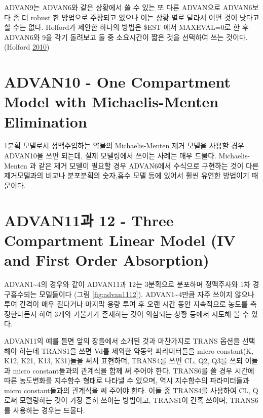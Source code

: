 \documentclass[
  11pt,
  krantz2, a4paper, twoside]{krantz}
\theoremstyle{definition}
\theoremstyle{definition}
\theoremstyle{definition}
\theoremstyle{remark}
\begin{document}

ADVAN9는 ADVAN6와 같은 상황에서 쓸 수 있는 또 다른 ADVAN으로 ADVAN6보다 좀 더 robust 한 방법으로 주장되고 있으나 이는 상황 별로 달라서 어떤 것이 낫다고 할 수는 없다. Holford가 제안한 하나의 방법은 \$EST 에서 MAXEVAL=0로 한 후 ADVAN6와 9을 각기 돌려보고 둘 중 소요시간이 짧은 것을 선택하여 쓰는 것이다. (Holford \protect\hyperlink{ref-nickholford}{2010})

\hypertarget{advan10---one-compartment-model-with-michaelis-menten-elimination}{%
\section{ADVAN10 - One Compartment Model with Michaelis-Menten Elimination}\label{advan10---one-compartment-model-with-michaelis-menten-elimination}}


1분획 모델로서 정맥주입하는 약물의 Michaelis-Menten 제거 모델을 사용할 경우 ADVAN10을 쓰면 되는데, 실제 모델링에서 쓰이는 사례는 매우 드물다. Michaelis-Menten 과 같은 제거 모델이 필요할 경우 ADVAN6에서 수식으로 구현하는 것이 다른 제거모델과의 비교나 분포분획의 숫자,흡수 모델 등에 있어서 훨씬 유연한 방법이기 때문이다.

\hypertarget{advan11uxacfc-12---three-compartment-linear-model-iv-and-first-order-absorption}{%
\section{ADVAN11과 12 - Three Compartment Linear Model (IV and First Order Absorption)}\label{advan11uxacfc-12---three-compartment-linear-model-iv-and-first-order-absorption}}


ADVAN1\textasciitilde4의 경우와 같이 ADVAN11과 12는 3분획으로 분포하며 정맥주사와 1차 경구흡수되는 모델들이다 (그림 \ref{fig:advan1112}). ADVAN1\textasciitilde4만큼 자주 쓰이지 않으나 투여 간격이 매우 길다거나 마지막 용량 투여 후 오랜 시간 동안 지속적으로 농도를 측정한다든지 하여 3개의 기울기가 존재하는 것이 의심되는 상황 등에서 시도해 볼 수 있다.

ADVAN11의 예를 들면 앞의 장들에서 소개된 것과 마찬가지로 TRANS 옵션을 선택해야 하는데 TRANS1을 쓰면 Vd를 제외한 약동학 파라미터들을 micro constant(K, K12, K21, K13, K31)들을 써서 표현하며, TRANS4를 쓰면 CL, Q2, Q3를 쓰되 이들과 micro constant들과의 관계식을 함께 써 주어야 한다. TRANS6를 쓸 경우 시간에 따른 농도변화를 지수함수 형태로 나타낼 수 있으며, 역시 지수함수의 파라미터들과 micro constant들과의 관계식을 써 주어야 한다. 이들 중 TRANS4를 사용하여 CL, Q로써 모델링하는 것이 가장 흔히 쓰이는 방법이고, TRANS1이 간혹 쓰이며, TRANS6를 사용하는 경우는 드물다.
\end{document}
